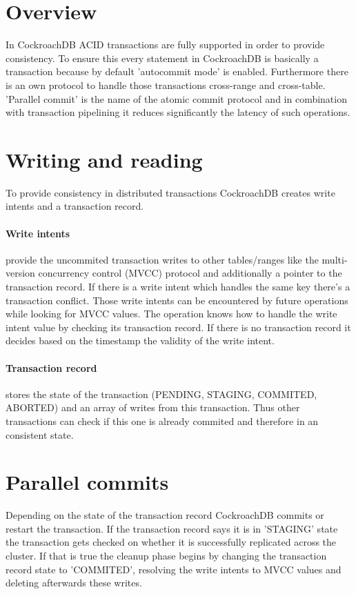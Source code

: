\documentclass[12pt,a4paper]{article}
\begin{document}
\section{Overview}
In CockroachDB ACID transactions are fully supported in order to provide consistency. To ensure this every statement in 
CockroachDB is basically a transaction because by default 'autocommit mode' is enabled. Furthermore there is an own protocol
to handle those transactions cross-range and cross-table. 'Parallel commit' is the name of the atomic commit protocol and in
combination with transaction pipelining it reduces significantly the latency of such operations.

\section{Writing and reading}
To provide consistency in distributed transactions CockroachDB creates write intents and a transaction record.

\paragraph{Write intents} provide the uncommited transaction writes to other tables/ranges like the multi-version concurrency 
control (MVCC) protocol and additionally a pointer to the transaction record. If there is a write intent which handles the
same key there's a transaction conflict. Those write intents can be encountered by future operations while looking for 
MVCC values. The operation knows how to handle the write intent value by checking its transaction record. If there is no 
transaction record it decides based on the timestamp the validity of the write intent. 

\paragraph{Transaction record} stores the state of the transaction (PENDING, STAGING, COMMITED, ABORTED) and an array of
writes from this transaction. Thus other transactions can check if this one is already commited and therefore in an
consistent state.

\section{Parallel commits}
Depending on the state of the transaction record CockroachDB commits or restart the transaction. If the transaction record
says it is in 'STAGING' state the transaction gets checked on whether it is successfully replicated across the cluster. 
If that is true the cleanup phase begins by changing the transaction record state to 'COMMITED', resolving the write intents 
to MVCC values and deleting afterwards these writes.
\end{document}
